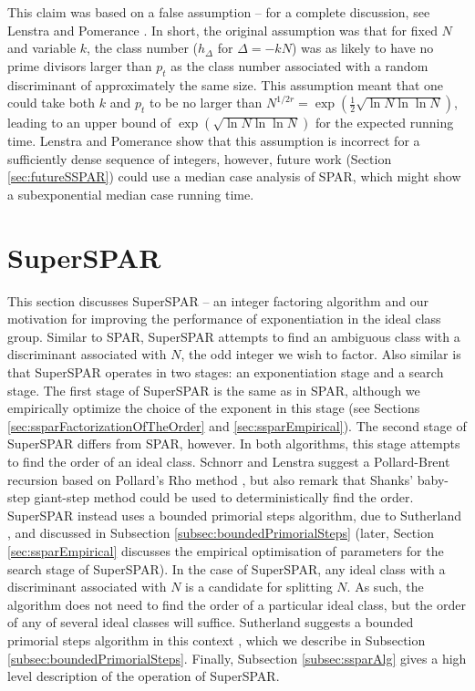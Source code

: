 \documentclass{ucalgthes1}
\theoremstyle{definition}
\begin{document}
This claim was based on a false assumption -- for a complete discussion, see Lenstra and Pomerance \cite[\S~11]{Lenstra1992}.  In short, the original assumption was that for fixed $N$ and variable $k$, the class number ($h_\Delta$ for $\Delta = -kN$) was as likely to have no prime divisors larger than $p_t$ as the class number associated with a random discriminant of approximately the same size.  This assumption meant that one could take both $k$ and $p_t$ to be no larger than $N^{1/2r} = \exp\left(\frac{1}{2}\sqrt{\ln N \ln \ln N}\right)$, leading to an upper bound of $\exp\left(\sqrt{\ln N \ln \ln N}\right)$ for the expected running time.  Lenstra and Pomerance show \cite[\S 11]{Lenstra1992} that this assumption is incorrect for a sufficiently dense sequence of integers, however, future work (Section \ref{sec:futureSSPAR}) could use a median case analysis of SPAR, which might show a subexponential median case running time.


\section{SuperSPAR}
\label{sec:superSpar}

This section discusses SuperSPAR -- an integer factoring algorithm and our motivation for improving the performance of exponentiation in the ideal class group.  Similar to SPAR, SuperSPAR attempts to find an ambiguous class with a discriminant associated with $N$, the odd integer we wish to factor.  Also similar is that SuperSPAR operates in two stages: an exponentiation stage and a search stage.  The first stage of SuperSPAR is the same as in SPAR, although we empirically optimize the choice of the exponent in this stage (see Sections \ref{sec:ssparFactorizationOfTheOrder} and \ref{sec:ssparEmpirical}).  The second stage of SuperSPAR differs from SPAR, however.  In both algorithms, this stage attempts to find the order of an ideal class.  Schnorr and Lenstra \mbox{\cite[p.294]{Schnorr1984}} suggest a Pollard-Brent recursion \cite{Brent1980} based on Pollard's Rho method \cite{Pollard1975}, but also remark \cite[p.298]{Schnorr1984} that Shanks' baby-step giant-step method \cite{Shanks1971} could be used to deterministically find the order.  SuperSPAR instead uses a bounded primorial steps algorithm, due to Sutherland \cite[\S 4.1]{Sutherland2007}, and discussed in Subsection \ref{subsec:boundedPrimorialSteps} (later, Section \ref{sec:ssparEmpirical} discusses the empirical optimisation of parameters for the search stage of SuperSPAR).  In the case of SuperSPAR, any ideal class with a discriminant associated with $N$ is a candidate for splitting $N$.  As such, the algorithm does not need to find the order of a particular ideal class, but the order of any of several ideal classes will suffice.  Sutherland suggests a bounded primorial steps algorithm in this context \cite[\S 5.4]{Sutherland2007}, which we describe in Subsection \ref{subsec:boundedPrimorialSteps}.  Finally, Subsection \ref{subsec:ssparAlg} gives a high level description of the operation of SuperSPAR.
\end{document}
